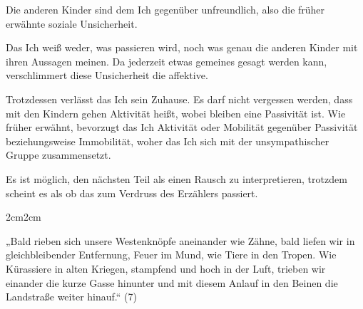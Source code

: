 \documentclass[12pt,a4paper]{article}
\newenvironment{longquote}
{%
    \vspace{-1em}
    \begin{adjustwidth}{2cm}{2cm}
        \singlespacing
        \fontsize{10}{12}\selectfont
    }
{%
    \end{adjustwidth}
}
\begin{document}
\vspace{-1em}
\begin{description}[
        style=multiline,
        leftmargin=12em,
        labelwidth=9em,
        labelsep=0.5em,
    ] 
        \item [Affektive Unsicherheit:] Die anderen Kinder sind dem Ich gegenüber unfreundlich, also die früher erwähnte soziale Unsicherheit.
        \item [Epistemologische Unsicherheit:] Das Ich weiß weder, was passieren wird, noch was genau die anderen Kinder mit ihren Aussagen meinen. Da jederzeit etwas gemeines gesagt werden kann, verschlimmert diese Unsicherheit die affektive.
\end{description}
\vspace{-1em}
%
Trotzdessen verlässt das Ich sein Zuhause. Es darf nicht vergessen werden, dass mit den Kindern gehen Aktivität heißt, wobei bleiben eine Passivität ist. Wie früher erwähnt, bevorzugt das Ich Aktivität oder Mobilität gegenüber Passivität beziehungsweise Immobilität, woher das Ich sich mit der unsympathischer Gruppe zusammensetzt.\par
%
Es ist möglich, den nächsten Teil als einen Rausch zu interpretieren, trotzdem scheint es als ob das zum Verdruss des Erzählers passiert. 
%
\begin{longquote}
    „Bald rieben sich unsere Westenknöpfe aneinander wie Zähne, bald liefen wir in gleichbleibender Entfernung, Feuer im Mund, wie Tiere in den Tropen. Wie Kürassiere in alten Kriegen, stampfend und hoch in der Luft, trieben wir einander die kurze Gasse hinunter und mit diesem Anlauf in den Beinen die Landstraße weiter hinauf.“ (7)
\end{longquote}
%
\end{document}

